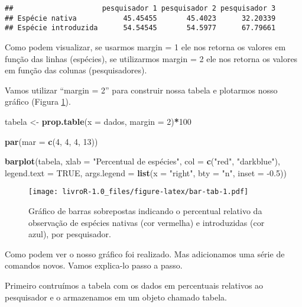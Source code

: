 \documentclass[14pt,titlepage, oneside, openany, a4paper]{book}
\newenvironment{Shaded}{\begin{snugshade}}{\end{snugshade}}
\newcommand{\DataTypeTok}[1]{\textcolor[rgb]{0.13,0.29,0.53}{#1}}
\newcommand{\DecValTok}[1]{\textcolor[rgb]{0.00,0.00,0.81}{#1}}
\newcommand{\FloatTok}[1]{\textcolor[rgb]{0.00,0.00,0.81}{#1}}
\newcommand{\KeywordTok}[1]{\textcolor[rgb]{0.13,0.29,0.53}{\textbf{#1}}}
\newcommand{\NormalTok}[1]{#1}
\newcommand{\OperatorTok}[1]{\textcolor[rgb]{0.81,0.36,0.00}{\textbf{#1}}}
\newcommand{\OtherTok}[1]{\textcolor[rgb]{0.56,0.35,0.01}{#1}}
\newcommand{\StringTok}[1]{\textcolor[rgb]{0.31,0.60,0.02}{#1}}
\begin{document}
\begin{verbatim}
##                     pesquisador 1 pesquisador 2 pesquisador 3
## Espécie nativa           45.45455       45.4023      32.20339
## Espécie introduzida      54.54545       54.5977      67.79661
\end{verbatim}

Como podem visualizar, se usarmos margin = 1 ele nos retorna os valores em função das linhas (espécies), se utilizarmos margin = 2 ele nos retorna os valores em função das colunas (pesquisadores).

Vamos utilizar ``margin = 2'' para construir nossa tabela e plotarmos nosso gráfico (Figura \ref{fig:bar-tab}).

\begin{Shaded}
\begin{Highlighting}[]
\NormalTok{tabela <-}\StringTok{ }\KeywordTok{prop.table}\NormalTok{(}\DataTypeTok{x =}\NormalTok{ dados, }\DataTypeTok{margin =} \DecValTok{2}\NormalTok{)}\OperatorTok{*}\DecValTok{100}

\KeywordTok{par}\NormalTok{(}\DataTypeTok{mar =} \KeywordTok{c}\NormalTok{(}\DecValTok{4}\NormalTok{, }\DecValTok{4}\NormalTok{, }\DecValTok{4}\NormalTok{, }\DecValTok{13}\NormalTok{))}

\KeywordTok{barplot}\NormalTok{(tabela, }
        \DataTypeTok{xlab =} \StringTok{"Percentual de espécies"}\NormalTok{,}
        \DataTypeTok{col =} \KeywordTok{c}\NormalTok{(}\StringTok{"red"}\NormalTok{, }\StringTok{"darkblue"}\NormalTok{), }
        \DataTypeTok{legend.text =} \OtherTok{TRUE}\NormalTok{, }
        \DataTypeTok{args.legend =} \KeywordTok{list}\NormalTok{(}\DataTypeTok{x =} \StringTok{"right"}\NormalTok{, }\DataTypeTok{bty =} \StringTok{"n"}\NormalTok{, }\DataTypeTok{inset =} \FloatTok{-0.5}\NormalTok{))}
\end{Highlighting}
\end{Shaded}

\begin{figure}
\centering
\texttt{[image: livroR-1.0\_files/figure-latex/bar-tab-1.pdf]}
\caption{\label{fig:bar-tab}Gráfico de barras sobrepostas indicando o percentual relativo da observação de espécies nativas (cor vermelha) e introduzidas (cor azul), por pesquisador.}
\end{figure}

Como podem ver o nosso gráfico foi realizado. Mas adicionamos uma série de comandos novos. Vamos explica-lo passo a passo.

Primeiro contruímos a tabela com os dados em percentuais relativos ao pesquisador e o armazenamos em um objeto chamado tabela.
\end{document}
